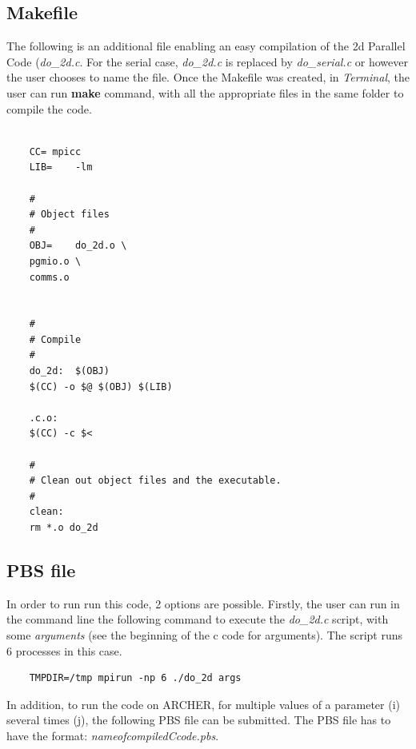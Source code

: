 \documentclass[11pt]{article}
\begin{document}
	\subsection{Makefile}
	The following is an additional file enabling an easy compilation of the 2d Parallel Code (\textit{do\_2d.c}. For the serial case, \textit{do\_2d.c} is replaced by \textit{do\_serial.c} or however the user chooses to name the file. Once the Makefile was created, in \textit{Terminal}, the user can run \textbf{make} command, with all the appropriate files in the same folder to compile the code.
	
	\begin{lstlisting}
	
	CC=	mpicc
	LIB=	-lm
	
	#
	# Object files
	#
	OBJ=	do_2d.o \
	pgmio.o \
	comms.o
	
	
	#
	# Compile
	#
	do_2d:	$(OBJ)
	$(CC) -o $@ $(OBJ) $(LIB)
	
	.c.o:
	$(CC) -c $<
	
	#
	# Clean out object files and the executable.
	#
	clean:
	rm *.o do_2d
	\end{lstlisting}
	
	\subsection{PBS file}
	In order to run run this code, 2 options are possible. Firstly, the user can run in the command line the following command to execute the \textit{do\_2d.c} script, with some \textit{arguments} (see the beginning of the c code for arguments). The script runs 6 processes in this case.
	\begin{lstlisting}
	TMPDIR=/tmp mpirun -np 6 ./do_2d args
	\end{lstlisting}
	
	In addition, to run the code on ARCHER, for multiple values of a parameter (i) several times (j), the following PBS file can be submitted. The PBS file has to have the format: \textit{nameofcompiledCcode.pbs}.
	
\end{document}
